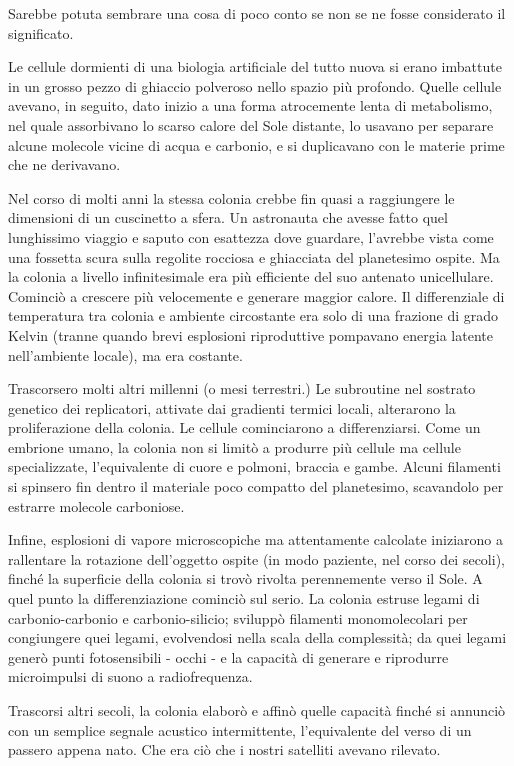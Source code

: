 Sarebbe potuta sembrare una cosa di poco conto se non se ne fosse
considerato il significato.

Le cellule dormienti di una biologia artificiale del tutto nuova si
erano imbattute in un grosso pezzo di ghiaccio polveroso nello spazio
più profondo. Quelle cellule avevano, in seguito, dato inizio a una
forma atrocemente lenta di metabolismo, nel quale assorbivano lo scarso
calore del Sole distante, lo usavano per separare alcune molecole vicine
di acqua e carbonio, e si duplicavano con le materie prime che ne
derivavano.

Nel corso di molti anni la stessa colonia crebbe fin quasi a raggiungere
le dimensioni di un cuscinetto a sfera. Un astronauta che avesse fatto
quel lunghissimo viaggio e saputo con esattezza dove guardare, l'avrebbe
vista come una fossetta scura sulla regolite rocciosa e ghiacciata del
planetesimo ospite. Ma la colonia a livello infinitesimale era più
efficiente del suo antenato unicellulare. Cominciò a crescere più
velocemente e generare maggior calore. Il differenziale di temperatura
tra colonia e ambiente circostante era solo di una frazione di grado
Kelvin (tranne quando brevi esplosioni riproduttive pompavano energia
latente nell'ambiente locale), ma era costante.

Trascorsero molti altri millenni (o mesi terrestri.) Le subroutine nel
sostrato genetico dei replicatori, attivate dai gradienti termici
locali, alterarono la proliferazione della colonia. Le cellule
cominciarono a differenziarsi. Come un embrione umano, la colonia non si
limitò a produrre più cellule ma cellule specializzate, l'equivalente di
cuore e polmoni, braccia e gambe. Alcuni filamenti si spinsero fin
dentro il materiale poco compatto del planetesimo, scavandolo per
estrarre molecole carboniose.

Infine, esplosioni di vapore microscopiche ma attentamente calcolate
iniziarono a rallentare la rotazione dell'oggetto ospite (in modo
paziente, nel corso dei secoli), finché la superficie della colonia si
trovò rivolta perennemente verso il Sole. A quel punto la
differenziazione cominciò sul serio. La colonia estruse legami di
carbonio-carbonio e carbonio-silicio; sviluppò filamenti monomolecolari
per congiungere quei legami, evolvendosi nella scala della complessità;
da quei legami generò punti fotosensibili - occhi - e la capacità di
generare e riprodurre microimpulsi di suono a radiofrequenza.

Trascorsi altri secoli, la colonia elaborò e affinò quelle capacità
finché si annunciò con un semplice segnale acustico intermittente,
l'equivalente del verso di un passero appena nato. Che era ciò che i
nostri satelliti avevano rilevato.

